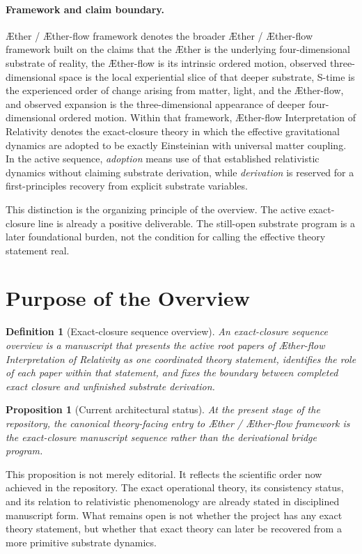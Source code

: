 \documentclass[11pt]{article}
\newcommand{\Aether}{\AE{}ther}
\newcommand{\Aflow}{\AE{}ther-flow}
\newcommand{\TheoryName}{\Aflow{} Interpretation of Relativity}
\newcommand{\TheoryProgram}{\Aether{} / \Aflow{} framework}
\newtheorem{definition}{Definition}
\newtheorem{proposition}{Proposition}
\begin{document}
\paragraph{Framework and claim boundary.}
\TheoryProgram{} denotes the broader \Aether{} / \Aflow{} framework built on the claims that the \Aether{} is the underlying four-dimensional substrate of reality, the \Aflow{} is its intrinsic ordered motion, observed three-dimensional space is the local experiential slice of that deeper substrate, S-time is the experienced order of change arising from matter, light, and the \Aflow{}, and observed expansion is the three-dimensional appearance of deeper four-dimensional ordered motion. Within that framework, \TheoryName{} denotes the exact-closure theory in which the effective gravitational dynamics are adopted to be exactly Einsteinian with universal matter coupling. In the active sequence, \emph{adoption} means use of that established relativistic dynamics without claiming substrate derivation, while \emph{derivation} is reserved for a first-principles recovery from explicit substrate variables.

This distinction is the organizing principle of the overview. The active exact-closure line is already a positive deliverable. The still-open substrate program is a later foundational burden, not the condition for calling the effective theory statement real.

\section{Purpose of the Overview}

\begin{definition}[Exact-closure sequence overview]
An exact-closure sequence overview is a manuscript that presents the active root papers of \TheoryName{} as one coordinated theory statement, identifies the role of each paper within that statement, and fixes the boundary between completed exact closure and unfinished substrate derivation.
\end{definition}

\begin{proposition}[Current architectural status]
At the present stage of the repository, the canonical theory-facing entry to \TheoryProgram{} is the exact-closure manuscript sequence rather than the derivational bridge program.
\end{proposition}

This proposition is not merely editorial. It reflects the scientific order now achieved in the repository. The exact operational theory, its consistency status, and its relation to relativistic phenomenology are already stated in disciplined manuscript form. What remains open is not whether the project has any exact theory statement, but whether that exact theory can later be recovered from a more primitive substrate dynamics.
\end{document}
